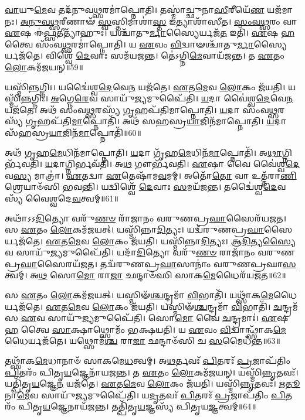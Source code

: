 \-\ul{𑌵𑌾}\-𑌯𑍁\-\ul{𑌮𑍇}\-𑌵 𑌤𑌦᳴𑌨𑍁𑌵\-\ul{𑌥𑍍𑌸}\-𑌰𑌮𑌾॑𑌪𑍍𑌨𑍋𑌤𑌿।
𑌤𑌸𑍍𑌮𑌾॑𑌚𑍍𑌛𑍁𑌨𑌾\-\ul{𑌸𑍀}\-𑌰𑍀𑌯𑍇᳴\-\ul{𑌣} 𑌯𑌜᳴𑌮𑌾𑌨𑌃।
\-\ul{𑌅}\-\-\ul{𑌨𑍁}\-\-\ul{𑌵}\-\-\ul{𑌥𑍍𑌸}\-𑌰𑍀𑌣𑌾𑍟᳴ \ul{𑌸𑍍𑌵}\-𑌸𑍍𑌤𑌿𑌮𑌾𑌶𑌾॑\-\ul{𑌸𑍍𑌤} 𑌇𑌤𑍍𑌯𑌾𑌶𑌾᳴𑌸𑍀𑌤।
\-\ul{𑌸𑌂}\-\-\ul{𑌵}\-\-\ul{𑌥𑍍𑌸}\-𑌰𑌂 𑌵𑌾 \ul{𑌏}\-𑌷 𑌈॑\-\ul{𑌫𑍍𑌸}\-𑌤𑍀𑌤𑍍𑌯𑌾᳴𑌹𑍁𑌃।
𑌯𑌶𑍍𑌚𑌾᳴𑌤𑍁\-\ul{𑌰𑍍𑌮𑌾}\-𑌸𑍍𑌯𑍈𑌰𑍍𑌯𑌜᳴\-\ul{𑌤} 𑌇𑌤𑌿᳴।
\-\ul{𑌏}\-𑌷 \ul{𑌹} 𑌤𑍍𑌵𑍈 𑌸𑌂᳴𑌵\-\ul{𑌥𑍍𑌸}\-𑌰𑌮𑌾॑𑌪𑍍𑌨𑍋𑌤𑌿।
𑌯 \ul{𑌏}\-𑌵𑌂 \ul{𑌵𑌿}\-𑌦𑍍𑌵𑌾𑍟𑌶𑍍𑌚𑌾᳴𑌤𑍁\-\ul{𑌰𑍍𑌮𑌾}\-𑌸𑍍𑌯𑍈𑌰𑍍𑌯𑌜᳴𑌤𑍇।
𑌵𑌿𑌶𑍍𑌵𑍇᳴ \ul{𑌦𑍇}\-𑌵𑌾𑌃 𑌸𑌮᳴𑌯𑌜𑌨𑍍𑌤।
𑌤𑍇॑𑌽𑌗𑍍𑌨𑌿\-\ul{𑌮𑍇}\-𑌵𑌾𑌯᳴𑌜𑌨𑍍𑌤।
𑌤 \ul{𑌏}\-𑌤𑌂 \ul{𑌲𑍋}\-𑌕𑌮᳴𑌜𑌯𑌨𑍍॥59॥

𑌯𑌸𑍍𑌮𑌿᳴\-\ul{𑌨𑍍𑌨}\-𑌗𑍍𑌨𑌿𑌃।
𑌯𑌦𑍍𑌵𑍈॑𑌶𑍍𑌵\-\ul{𑌦𑍇}\-𑌵𑍇\-\ul{𑌨} 𑌯𑌜᳴𑌤𑍇।
\-\ul{𑌏}\-𑌤\-\ul{𑌮𑍇}\-𑌵 \ul{𑌲𑍋}\-𑌕𑌂 𑌜᳴𑌯𑌤𑌿।
𑌯𑌸𑍍𑌮𑌿᳴\-\ul{𑌨𑍍𑌨}\-𑌗𑍍𑌨𑌿𑌃।
\-\ul{𑌅}\-𑌗𑍍𑌨𑍇\-\ul{𑌰𑍇}\-𑌵 𑌸𑌾𑌯𑍁᳴\-\ul{𑌜𑍍𑌯}\-𑌮𑍁𑌪𑍈᳴𑌤𑌿।
\-\ul{𑌯}\-𑌦𑌾 𑌵𑍈॑𑌶𑍍𑌵\-\ul{𑌦𑍇}\-𑌵𑍇\-\ul{𑌨} 𑌯𑌜᳴𑌤𑍇।
𑌅𑌥᳴ 𑌸𑌂𑌵\-\ul{𑌥𑍍𑌸}\-𑌰𑌸𑍍𑌯᳴ \ul{𑌗𑍃}\-𑌹𑌪᳴𑌤𑌿𑌮𑌾𑌪𑍍𑌨𑍋𑌤𑌿।
\-\ul{𑌯}\-𑌦𑌾 𑌸𑌂᳴𑌵\-\ul{𑌥𑍍𑌸}\-𑌰𑌸𑍍𑌯᳴ \ul{𑌗𑍃}\-𑌹𑌪᳴𑌤𑌿\-\ul{𑌮𑌾}\-𑌪𑍍𑌨𑍋𑌤𑌿᳴।
𑌅𑌥᳴ 𑌸𑌹𑌸𑍍𑌰\-\ul{𑌯𑌾}\-𑌜𑌿𑌨᳴𑌮𑌾𑌪𑍍𑌨𑍋𑌤𑌿।
\-\ul{𑌯}\-𑌦𑌾 𑌸᳴𑌹𑌸𑍍𑌰\-\ul{𑌯𑌾}\-𑌜𑌿𑌨᳴\-\ul{𑌮𑌾}\-𑌪𑍍𑌨𑍋𑌤𑌿᳴॥60॥

𑌅𑌥᳴ 𑌗𑍃𑌹\-\ul{𑌮𑍇}\-𑌧𑌿𑌨᳴𑌮𑌾𑌪𑍍𑌨𑍋𑌤𑌿।
\-\ul{𑌯}\-𑌦𑌾 𑌗𑍃᳴𑌹\-\ul{𑌮𑍇}\-𑌧𑌿𑌨᳴\-\ul{𑌮𑌾}\-𑌪𑍍𑌨𑍋𑌤𑌿᳴।
𑌅\-\ul{𑌥𑌾}\-𑌗𑍍𑌨𑌿𑌰𑍍𑌭᳴𑌵𑌤𑌿।
\-\ul{𑌯}\-𑌦𑌾𑌗𑍍𑌨𑌿𑌰𑍍𑌭𑌵᳴𑌤𑌿।
𑌅\-\ul{𑌥} 𑌗𑍗𑌰𑍍𑌭᳴𑌵𑌤𑌿।
\-\ul{𑌏}\-𑌷𑌾 𑌵𑍈 𑌵𑍈॑𑌶𑍍𑌵\-\ul{𑌦𑍇}\-𑌵\-\ul{𑌸𑍍𑌯} 𑌮𑌾𑌤𑍍𑌰𑌾॑।
\-\ul{𑌏}\-𑌤𑌦𑍍𑌵𑌾 \ul{𑌏}\-𑌤𑍇𑌷𑌾᳴𑌮\-\ul{𑌵}\-𑌮𑌮𑍍।
𑌅𑌤𑍋᳴\-\ul{𑌤𑍋} 𑌵𑌾 𑌉𑌤𑍍𑌤᳴𑌰𑌾\-\ul{𑌣𑌿} 𑌶𑍍𑌰𑍇𑌯𑌾𑍞᳴𑌸𑌿 𑌭𑌵𑌨𑍍𑌤𑌿।
𑌯𑌦𑍍𑌵𑌿𑌶𑍍𑌵𑍇᳴ \ul{𑌦𑍇}\-𑌵𑌾𑌃 \ul{𑌸}\-𑌮𑌯᳴𑌜𑌨𑍍𑌤।
𑌤𑌦𑍍𑌵𑍈॑𑌶𑍍𑌵\-\ul{𑌦𑍇}\-𑌵𑌸𑍍𑌯᳴ 𑌵𑍈𑌶𑍍𑌵𑌦𑍇\-\ul{𑌵}\-𑌤𑍍𑌵𑌮𑍍॥61॥

𑌅𑌥𑌾᳴𑌽𑌽\-\ul{𑌦𑌿}\-𑌤𑍍𑌯𑍋 𑌵𑌰𑍁᳴\-\ul{𑌣}\-\-\ul{𑍞} 𑌰𑌾᳴𑌜𑌾𑌨𑌂 𑌵𑌰𑍁𑌣𑌪𑍍𑌰\-\ul{𑌘𑌾}\-𑌸𑍈𑌰᳴𑌯𑌜𑌤।
𑌸 \ul{𑌏}\-𑌤𑌂 \ul{𑌲𑍋}\-𑌕𑌮᳴𑌜𑌯𑌤𑍍।
𑌯𑌸𑍍𑌮𑌿᳴𑌨𑍍𑌨𑌾\-\ul{𑌦𑌿}\-𑌤𑍍𑌯𑌃।
𑌯𑌦𑍍𑌵᳴𑌰𑍁𑌣𑌪𑍍𑌰\-\ul{𑌘𑌾}\-𑌸𑍈𑌰𑍍𑌯𑌜᳴𑌤𑍇।
\-\ul{𑌏}\-𑌤\-\ul{𑌮𑍇}\-𑌵 \ul{𑌲𑍋}\-𑌕𑌂 𑌜᳴𑌯𑌤𑌿।
𑌯𑌸𑍍𑌮𑌿᳴𑌨𑍍𑌨𑌾\-\ul{𑌦𑌿}\-𑌤𑍍𑌯𑌃।
\-\ul{𑌆}\-\-\ul{𑌦𑌿}\-𑌤𑍍𑌯\-\ul{𑌸𑍍𑌯𑍈}\-𑌵 𑌸𑌾𑌯𑍁᳴\-\ul{𑌜𑍍𑌯}\-𑌮𑍁𑌪𑍈᳴𑌤𑌿।
𑌯𑌦𑌾᳴\-\ul{𑌦𑌿}\-𑌤𑍍𑌯𑍋 𑌵𑌰𑍁᳴\-\ul{𑌣}\-\-\ul{𑍞} 𑌰𑌾𑌜𑌾᳴𑌨𑌂 𑌵𑌰𑍁𑌣𑌪𑍍𑌰\-\ul{𑌘𑌾}\-𑌸𑍈\-𑌰𑌯᳴𑌜𑌤।
𑌤𑌦𑍍𑌵᳴𑌰𑍁𑌣𑌪𑍍𑌰\-\ul{𑌘𑌾}\-𑌸𑌾𑌨𑌾𑌂॑ 𑌵𑌰𑍁𑌣𑌪𑍍𑌰𑌘𑌾\-\ul{𑌸}\-𑌤𑍍𑌵𑌮𑍍।
𑌅\-\ul{𑌥} 𑌸𑍋\-\ul{𑌮𑍋} 𑌰𑌾\-\ul{𑌜𑌾} 𑌛𑌨𑍍𑌦𑌾𑍞᳴𑌸𑌿 𑌸𑌾𑌕\-\ul{𑌮𑍇}\-𑌧𑍈𑌰᳴𑌯𑌜𑌤॥62॥

𑌸 \ul{𑌏}\-𑌤𑌂 \ul{𑌲𑍋}\-𑌕𑌮᳴𑌜𑌯𑌤𑍍।
𑌯𑌸𑍍𑌮𑌿𑍟᳴\-\ul{𑌶𑍍𑌚}\-𑌨𑍍𑌦𑍍𑌰𑌮𑌾᳴ \ul{𑌵𑌿}\-𑌭𑌾𑌤𑌿᳴।
𑌯𑌥𑍍𑌸𑌾᳴𑌕\-\ul{𑌮𑍇}\-𑌧𑍈𑌰𑍍𑌯𑌜᳴𑌤𑍇।
\-\ul{𑌏}\-𑌤\-\ul{𑌮𑍇}\-𑌵 \ul{𑌲𑍋}\-𑌕𑌂 𑌜᳴𑌯𑌤𑌿।
𑌯𑌸𑍍𑌮𑌿𑍟᳴\-\ul{𑌶𑍍𑌚}\-𑌨𑍍𑌦𑍍𑌰𑌮𑌾᳴ \ul{𑌵𑌿}\-𑌭𑌾𑌤𑌿᳴।
\-\ul{𑌚}\-𑌨𑍍𑌦𑍍𑌰𑌮᳴𑌸 \ul{𑌏}\-𑌵 𑌸𑌾𑌯𑍁᳴\-\ul{𑌜𑍍𑌯}\-𑌮𑍁𑌪𑍈᳴𑌤𑌿।
𑌸𑍋\-\ul{𑌮𑍋} 𑌵𑍈 \ul{𑌚}\-𑌨𑍍𑌦𑍍𑌰𑌮𑌾𑌃॑।
\-\ul{𑌏}\-𑌷 \ul{𑌹} 𑌤𑍍𑌵𑍈 \ul{𑌸𑌾}\-𑌕𑍍𑌷𑌾𑌥𑍍𑌸𑍋𑌮𑌂᳴ 𑌭𑌕𑍍𑌷𑌯𑌤𑌿।
𑌯 \ul{𑌏}\-𑌵𑌂 \ul{𑌵𑌿}\-𑌦𑍍𑌵𑌾𑌨𑍍𑌥𑍍𑌸𑌾᳴𑌕\-\ul{𑌮𑍇}\-𑌧𑍈𑌰𑍍𑌯𑌜᳴𑌤𑍇।
𑌯𑌥𑍍𑌸𑍋𑌮᳴\-\ul{𑌶𑍍𑌚} 𑌰𑌾\-\ul{𑌜𑌾} 𑌛𑌨𑍍𑌦𑌾𑍞᳴𑌸𑌿 𑌚 \ul{𑌸}\-𑌮𑍈𑌧᳴𑌨𑍍𑌤॥63॥

𑌤𑌥𑍍𑌸𑌾᳴𑌕\-\ul{𑌮𑍇}\-𑌧𑌾𑌨𑌾𑍞᳴ 𑌸𑌾𑌕𑌮𑍇\-\ul{𑌧}\-𑌤𑍍𑌵𑌮𑍍।
𑌅\-\ul{𑌥}\-𑌰𑍍𑌤𑌵𑌃᳴ \ul{𑌪𑌿}\-𑌤𑌰𑌃᳴ \ul{𑌪𑍍𑌰}\-𑌜𑌾𑌪᳴𑌤𑌿𑌂 \ul{𑌪𑌿}\-𑌤𑌰𑌂᳴ 𑌪𑌿𑌤𑍃\-\ul{𑌯}\-𑌜𑍍𑌞𑍇𑌨𑌾᳴𑌯𑌜𑌨𑍍𑌤।
𑌤 \ul{𑌏}\-𑌤𑌂 \ul{𑌲𑍋}\-𑌕𑌮᳴𑌜𑌯𑌨𑍍।
𑌯𑌸𑍍𑌮𑌿᳴\-\ul{𑌨𑍍𑌨𑍃}\-𑌤𑌵𑌃᳴।
𑌯𑌤𑍍𑌪𑌿᳴𑌤𑍃\-\ul{𑌯}\-𑌜𑍍𑌞𑍇\-\ul{𑌨} 𑌯𑌜᳴𑌤𑍇।
\-\ul{𑌏}\-𑌤\-\ul{𑌮𑍇}\-𑌵 \ul{𑌲𑍋}\-𑌕𑌂 𑌜᳴𑌯𑌤𑌿।
𑌯𑌸𑍍𑌮𑌿᳴\-\ul{𑌨𑍍𑌨𑍃}\-𑌤𑌵𑌃᳴।
\-\ul{𑌋}\-\-\ul{𑌤𑍂}\-𑌨𑌾\-\ul{𑌮𑍇}\-𑌵 𑌸𑌾𑌯𑍁᳴\-\ul{𑌜𑍍𑌯}\-𑌮𑍁𑌪𑍈᳴𑌤𑌿।
𑌯\-\ul{𑌦𑍃}\-𑌤𑌵𑌃᳴ \ul{𑌪𑌿}\-𑌤𑌰𑌃᳴ \ul{𑌪𑍍𑌰}\-𑌜𑌾𑌪᳴𑌤𑌿𑌂 \ul{𑌪𑌿}\-𑌤𑌰𑌂᳴ 𑌪𑌿𑌤𑍃\-\ul{𑌯}\-𑌜𑍍𑌞𑍇𑌨𑌾𑌯᳴𑌜𑌨𑍍𑌤।
𑌤𑌤𑍍𑌪𑌿᳴𑌤𑍃\-\ul{𑌯}\-𑌜𑍍𑌞𑌸𑍍𑌯᳴ 𑌪𑌿𑌤𑍃𑌯\-\ul{𑌜𑍍𑌞}\-𑌤𑍍𑌵𑌮𑍍॥64॥

